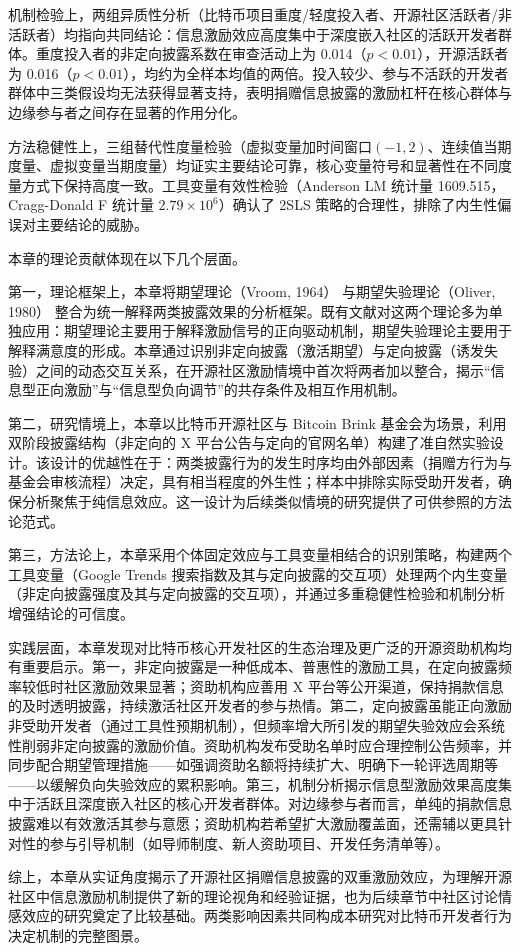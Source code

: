 机制检验上，两组异质性分析（比特币项目重度/轻度投入者、开源社区活跃者/非活跃者）均指向共同结论：信息激励效应高度集中于深度嵌入社区的活跃开发者群体。重度投入者的非定向披露系数在审查活动上为 0.014（$p < 0.01$），开源活跃者为 0.016（$p < 0.01$），均约为全样本均值的两倍。投入较少、参与不活跃的开发者群体中三类假设均无法获得显著支持，表明捐赠信息披露的激励杠杆在核心群体与边缘参与者之间存在显著的作用分化。

方法稳健性上，三组替代性度量检验（虚拟变量加时间窗口$(-1, 2)$、连续值当期度量、虚拟变量当期度量）均证实主要结论可靠，核心变量符号和显著性在不同度量方式下保持高度一致。工具变量有效性检验（Anderson LM 统计量 1609.515，Cragg-Donald F 统计量 $2.79 \times 10^6$）确认了 2SLS 策略的合理性，排除了内生性偏误对主要结论的威胁。

本章的理论贡献体现在以下几个层面。

第一，理论框架上，本章将期望理论（Vroom, 1964）\cite{vroom1964work} 与期望失验理论（Oliver, 1980）\cite{oliver1980cognitive} 整合为统一解释两类披露效果的分析框架。既有文献对这两个理论多为单独应用：期望理论主要用于解释激励信号的正向驱动机制，期望失验理论主要用于解释满意度的形成。本章通过识别非定向披露（激活期望）与定向披露（诱发失验）之间的动态交互关系，在开源社区激励情境中首次将两者加以整合，揭示“信息型正向激励”与“信息型负向调节”的共存条件及相互作用机制。

第二，研究情境上，本章以比特币开源社区与 Bitcoin Brink 基金会为场景，利用双阶段披露结构（非定向的 X 平台公告与定向的官网名单）构建了准自然实验设计。该设计的优越性在于：两类披露行为的发生时序均由外部因素（捐赠方行为与基金会审核流程）决定，具有相当程度的外生性；样本中排除实际受助开发者，确保分析聚焦于纯信息效应。这一设计为后续类似情境的研究提供了可供参照的方法论范式。

第三，方法论上，本章采用个体固定效应与工具变量相结合的识别策略，构建两个工具变量（Google Trends 搜索指数及其与定向披露的交互项）处理两个内生变量（非定向披露强度及其与定向披露的交互项），并通过多重稳健性检验和机制分析增强结论的可信度。

实践层面，本章发现对比特币核心开发社区的生态治理及更广泛的开源资助机构均有重要启示。第一，非定向披露是一种低成本、普惠性的激励工具，在定向披露频率较低时社区激励效果显著；资助机构应善用 X 平台等公开渠道，保持捐款信息的及时透明披露，持续激活社区开发者的参与热情。第二，定向披露虽能正向激励非受助开发者（通过工具性预期机制），但频率增大所引发的期望失验效应会系统性削弱非定向披露的激励价值。资助机构发布受助名单时应合理控制公告频率，并同步配合期望管理措施——如强调资助名额将持续扩大、明确下一轮评选周期等——以缓解负向失验效应的累积影响。第三，机制分析揭示信息型激励效果高度集中于活跃且深度嵌入社区的核心开发者群体。对边缘参与者而言，单纯的捐款信息披露难以有效激活其参与意愿；资助机构若希望扩大激励覆盖面，还需辅以更具针对性的参与引导机制（如导师制度、新人资助项目、开发任务清单等）。

综上，本章从实证角度揭示了开源社区捐赠信息披露的双重激励效应，为理解开源社区中信息激励机制提供了新的理论视角和经验证据，也为后续章节中社区讨论情感效应的研究奠定了比较基础。两类影响因素共同构成本研究对比特币开发者行为决定机制的完整图景。


